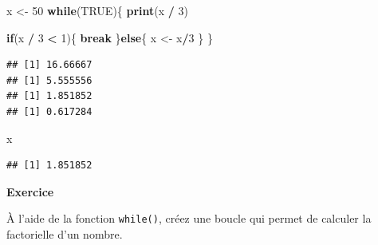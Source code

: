 \documentclass[
  11pt,
]{book}
\newenvironment{Shaded}{\begin{snugshade}}{\end{snugshade}}
\newcommand{\ConstantTok}[1]{\textcolor[rgb]{0.56,0.35,0.01}{#1}}
\newcommand{\ControlFlowTok}[1]{\textcolor[rgb]{0.13,0.29,0.53}{\textbf{#1}}}
\newcommand{\DecValTok}[1]{\textcolor[rgb]{0.00,0.00,0.81}{#1}}
\newcommand{\FunctionTok}[1]{\textcolor[rgb]{0.13,0.29,0.53}{\textbf{#1}}}
\newcommand{\NormalTok}[1]{#1}
\newcommand{\OtherTok}[1]{\textcolor[rgb]{0.56,0.35,0.01}{#1}}
\newcommand{\SpecialCharTok}[1]{\textcolor[rgb]{0.81,0.36,0.00}{\textbf{#1}}}
\numberwithin{equation}{section}
\numberwithin{countremarque}{section}
\newenvironment{notebox}{
  \begin{tcolorbox}[breakable, colback=jaune,coltext=black,
                  colframe=grisfonce]}
 {\end{tcolorbox}}
\newenvironment{greenbox}{
  \begin{tcolorbox}[breakable, colback=vert,coltext=black,
                  colframe=grisfonce]}
 {\end{tcolorbox}}
\begin{document}
\begin{notebox}
\begin{Shaded}
\begin{Highlighting}[]
\NormalTok{x }\OtherTok{\textless{}{-}} \DecValTok{50}
\ControlFlowTok{while}\NormalTok{(}\ConstantTok{TRUE}\NormalTok{)\{}
  \FunctionTok{print}\NormalTok{(x }\SpecialCharTok{/} \DecValTok{3}\NormalTok{)}
  
  \ControlFlowTok{if}\NormalTok{(x }\SpecialCharTok{/} \DecValTok{3} \SpecialCharTok{\textless{}} \DecValTok{1}\NormalTok{)\{}
    \ControlFlowTok{break}
\NormalTok{  \}}\ControlFlowTok{else}\NormalTok{\{}
\NormalTok{    x }\OtherTok{\textless{}{-}}\NormalTok{ x}\SpecialCharTok{/}\DecValTok{3}
\NormalTok{  \}}
\NormalTok{\}}
\end{Highlighting}
\end{Shaded}

\begin{lstlisting}
## [1] 16.66667
## [1] 5.555556
## [1] 1.851852
## [1] 0.617284
\end{lstlisting}

\begin{Shaded}
\begin{Highlighting}[]
\NormalTok{x}
\end{Highlighting}
\end{Shaded}

\begin{lstlisting}
## [1] 1.851852
\end{lstlisting}

\end{notebox}

\begin{greenbox}
\textbf{Exercice}

À l'aide de la fonction \texttt{while()}, créez une boucle qui permet de calculer la factorielle d'un nombre.

\end{greenbox}
\end{document}
